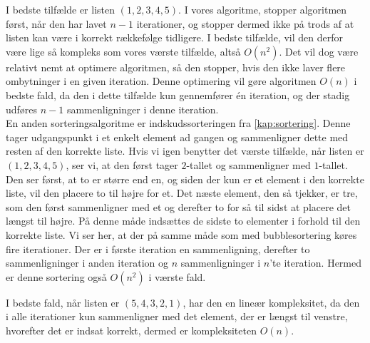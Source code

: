I bedste tilfælde er listen $(1, 2, 3, 4, 5)$.
I vores algoritme, stopper algoritmen først, når den har lavet $n-1$ iterationer, og stopper dermed ikke på trods af at listen kan være i korrekt rækkefølge tidligere. I bedste tilfælde, vil den derfor være lige så kompleks som vores værste tilfælde, altså $O(n^2)$. Det vil dog være relativt nemt at optimere algoritmen, så den stopper, hvis den ikke laver flere ombytninger i en given iteration. Denne optimering vil gøre algoritmen $O(n)$ i bedste fald, da den i dette tilfælde kun gennemfører én iteration, og der stadig udføres $n-1$ sammenligninger i denne iteration. 
\\

En anden sorteringsalgoritme er indskudssorteringen fra \autoref{kap:sortering}. Denne tager udgangspunkt i et enkelt element ad gangen og sammenligner dette med resten af den korrekte liste.
Hvis vi igen benytter det værste tilfælde, når listen er $(1,2,3,4,5)$, ser vi, at den først tager $2$-tallet og sammenligner med $1$-tallet. Den ser først, at to er større end en, og siden der kun er et element i den korrekte liste, vil den placere to til højre for et. Det næste element, den så tjekker, er tre, som den først sammenligner med et og derefter to for så til sidst at placere det længst til højre. På denne måde indsættes de sidste to elementer i forhold til den korrekte liste.
Vi ser her, at der på samme måde som med bubblesortering køres fire iterationer. Der er i første iteration en sammenligning, derefter to sammenligninger i anden iteration og $n$ sammenligninger i $n$'te iteration. Hermed er denne sortering også $O(n^2)$ i værste fald.


I bedste fald, når listen er $(5,4,3,2,1)$, har den en lineær kompleksitet, da den i alle iterationer kun sammenligner med det element, der er længst til venstre, hvorefter det er indsat korrekt, dermed er kompleksiteten $O(n)$.





